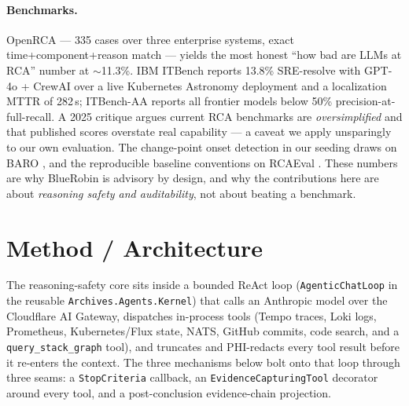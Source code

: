 \documentclass[11pt]{article}
\begin{document}
\paragraph{Benchmarks.}
OpenRCA \citep{xu2025openrca} --- 335 cases over three enterprise systems,
exact time+component+reason match --- yields the most honest ``how bad are
LLMs at RCA'' number at $\sim$11.3\%. IBM ITBench \citep{jha2025itbench}
reports 13.8\% SRE-resolve with GPT-4o + CrewAI over a live Kubernetes
Astronomy deployment and a localization MTTR of 282\,s; ITBench-AA
\citep{itbenchaa2026} reports all frontier models below 50\%
precision-at-full-recall. A 2025 critique \citep{rethinking2025rca} argues
current RCA benchmarks are \emph{oversimplified} and that published scores
overstate real capability --- a caveat we apply unsparingly to our own
evaluation. The change-point onset detection in our seeding draws on BARO
\citep{pham2024baro}, and the reproducible baseline conventions on RCAEval
\citep{pham2024rcaeval}. These numbers are why BlueRobin is advisory by
design, and why the contributions here are about \emph{reasoning safety and
auditability}, not about beating a benchmark.

\section{Method / Architecture}

The reasoning-safety core sits inside a bounded ReAct loop
(\texttt{AgenticChatLoop} in the reusable \texttt{Archives.Agents.Kernel})
that calls an Anthropic model over the Cloudflare AI Gateway, dispatches
in-process tools (Tempo traces, Loki logs, Prometheus, Kubernetes/Flux state,
NATS, GitHub commits, code search, and a \texttt{query\_stack\_graph} tool),
and truncates and PHI-redacts every tool result before it re-enters the
context. The three mechanisms below bolt onto that loop through three seams: a
\texttt{StopCriteria} callback, an \texttt{EvidenceCapturingTool} decorator
around every tool, and a post-conclusion evidence-chain projection.
\end{document}
